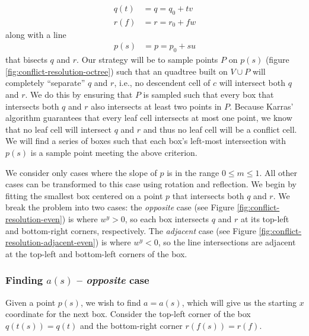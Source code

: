 \documentclass[submission]{gmp2017}
\begin{document}
\begin{align}
q(t) &= q = q_0 + tv \label{eqn:q} \\
r(f) &= r = r_0 + fw \label{eqn:r}
\end{align}
along with a line
\begin{align}
p(s) &= p = p_0 + su \label{eqn:p}
\end{align}
that bisects $q$ and $r$. Our strategy will be to sample points $P$ on $p(s)$ (figure \ref{fig:conflict-resolution-octree}) such that an quadtree built on $V \cup P$ will completely ``separate'' $q$ and $r$, i.e., no descendent cell of $c$ will intersect both $q$ and $r$. We do this by ensuring that $P$ is sampled such that every box that intersects both $q$ and $r$ also intersects at least two points in $P$. Because Karras' algorithm guarantees that every leaf cell intersects at most one point, we know that no leaf cell will intersect $q$ and $r$ and thus no leaf cell will be a conflict cell. We will find a series of boxes such that each box's left-most intersection with $p(s)$ is a sample point meeting the above criterion.

We consider only cases where the slope of $p$ is in the range $0 \le m \le 1$. All other cases can be transformed to this case using rotation and reflection. We begin by fitting the smallest box centered on a point $p$ that intersects both $q$ and $r$. We break the problem into two cases: the \textit{opposite} case (see Figure \ref{fig:conflict-resolution-even}) is where $w^y > 0$, so each box intersects $q$ and $r$ at its top-left and bottom-right corners, respectively. The \textit{adjacent} case (see Figure \ref{fig:conflict-resolution-adjacent-even}) is where $w^y < 0$, so the line intersections are adjacent at the top-left and bottom-left corners of the box.

\subsubsection{Finding $a(s)$ -- \textit{opposite} case}

Given a point $p(s)$, we wish to find $a=a(s)$, which will give us the starting $x$ coordinate for the next box. Consider the top-left corner of the box $q(t(s))=q(t)$ and the bottom-right corner $r(f(s))=r(f)$.
\end{document}
